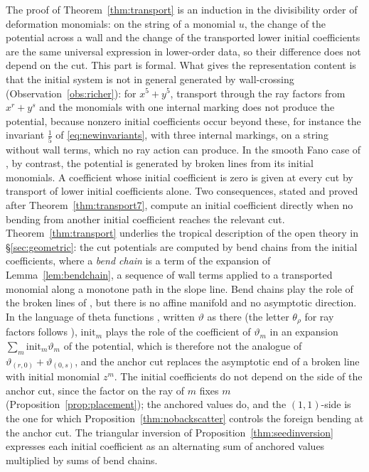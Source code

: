 \documentclass[11pt]{amsart}
\theoremstyle{definition}
\theoremstyle{remark}
\begin{document}
The proof of Theorem~\ref{thm:transport} is an induction in the divisibility
order of deformation monomials: on
the string of a monomial $u$, the change of the potential across a wall and
the change of the transported lower initial coefficients are the same universal
expression in lower-order data, so their difference does not depend on the
cut.  This part is formal.  What gives the representation content is that
the initial system is not in general generated by wall-crossing
(Observation~\ref{obs:richer}): for $x^5+y^5$, transport through the ray
factors from $x^r+y^s$ and the monomials with one internal marking does not
produce the potential, because nonzero initial coefficients occur beyond these, for
instance the invariant $\tfrac15$ of \eqref{eq:newinvariants}, with three
internal markings, on a string without wall terms, which no ray action can
produce.  In the smooth Fano case of \cite{Gross10,CPS}, by
contrast, the potential is generated by broken lines from its initial
monomials.  A coefficient whose initial
coefficient is zero is given at every cut by transport of lower initial
coefficients alone.  Two consequences, stated and proved after
Theorem~\ref{thm:transport7}, compute an initial coefficient directly when no
bending from another initial coefficient reaches the relevant cut.
Theorem~\ref{thm:transport} underlies the tropical description of the open
theory in \S\ref{sec:geometric}: the cut potentials are computed by bend chains
from the initial coefficients, where a \emph{bend chain} is a term of the
expansion of Lemma~\ref{lem:bendchain}, a sequence of wall terms applied to a
transported monomial along a monotone path in the slope line.  Bend chains
play the role of the broken lines of \cite{Gross10,CPS}, but there is no
affine manifold and no asymptotic direction.  In the language of theta
functions \cite{GHK15,GHKK}, written $\vartheta$ as there (the letter
$\theta_\rho$ for ray factors follows \cite{GPS10}), $\mathrm{init}_m$ plays
the role of the
coefficient of $\vartheta_m$ in an expansion $\sum_m\mathrm{init}_m\vartheta_m$
of the potential, which is therefore not the analogue of
$\vartheta_{(r,0)}+\vartheta_{(0,s)}$, and the anchor cut replaces the
asymptotic end of a broken line with initial monomial $z^m$.  The
initial coefficients do not depend on the side of the anchor cut, since the
factor on the ray of $m$ fixes $m$ (Proposition~\ref{prop:placement}); the
anchored values do, and the $(1,1)$-side is the one for which
Proposition~\ref{thm:nobackscatter} controls the foreign bending at the anchor
cut.  The triangular inversion of
Proposition~\ref{thm:seedinversion} expresses each initial coefficient as an
alternating sum of anchored values multiplied by sums of bend chains.
\end{document}
